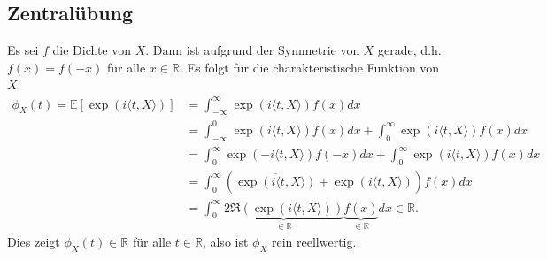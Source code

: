 \documentclass[a4paper]{article}
\begin{document}
\makeexheaderger

\subsection{Zentralübung}

Es sei $f$ die Dichte von $X$. Dann ist aufgrund der Symmetrie von $X$ gerade, d.h. $f(x) = f(-x)$ für alle $x \in \mathds{R}$. Es folgt für die charakteristische Funktion von $X$:
\begin{align*}
	\phi_X(t) = \mathds{E}[\exp(i \langle t, X \rangle)] & = \int_{-\infty}^{\infty} \exp(i\langle t, X \rangle) f(x) dx                                                                                     \\
	                                                     & = \int_{-\infty}^{0} \exp(i\langle t, X \rangle) f(x) dx + \int_{0}^{\infty} \exp(i\langle t, X \rangle) f(x) dx                                  \\
	                                                     & = \int_{0}^{\infty} \exp(-i\langle t, X \rangle) f(-x) dx + \int_{0}^{\infty} \exp(i\langle t, X \rangle) f(x) dx                                 \\
	                                                     & = \int_{0}^{\infty} (\overline{\exp(i\langle t, X \rangle)} + \exp(i\langle t, X \rangle)) f(x) dx
	\\
	                                                     & = \int_{0}^{\infty} \underbrace{2 \Re(\exp(i\langle t, X \rangle))}_{\in \mathds{R}} \underbrace{f(x)}_{\in \mathds{R}} dx \in \mathds{R}\text{.}
\end{align*}
Dies zeigt $\phi_X(t) \in \mathds{R}$ für alle $t \in \mathds{R}$, also ist $\phi_X$ rein reellwertig.

\addtocounter{subsection}{1}

\subsection{}
\end{document}
